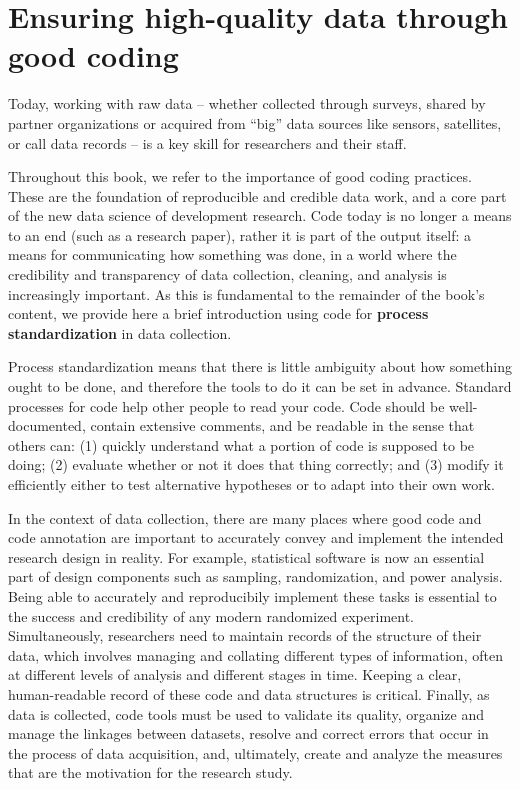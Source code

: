 \section{Ensuring high-quality data through good coding}


Today, working with raw data --
whether collected through surveys,
shared by partner organizations
or acquired from ``big'' data sources
like sensors, satellites, or call data records --
is a key skill for researchers and their staff.

Throughout this book, we refer to the importance of good coding practices.
These are the foundation of reproducible and credible data work,
and a core part of the new data science of development research.
Code today is no longer a means to an end (such as a research paper),
rather it is part of the output itself: a means for communicating how something was done,
in a world where the credibility and transparency of data collection, cleaning, and analysis is increasingly important.
As this is fundamental to the remainder of the book's content,
we provide here a brief introduction using code for \textbf{process standardization} in data collection.

Process standardization means that there is
little ambiguity about how something ought to be done,
and therefore the tools to do it can be set in advance.
Standard processes for code help other people to read your code.
Code should be well-documented, contain extensive comments, and be readable in the sense that others can:
(1) quickly understand what a portion of code is supposed to be doing;
(2) evaluate whether or not it does that thing correctly; and
(3) modify it efficiently either to test alternative hypotheses
or to adapt into their own work.

In the context of data collection, there are many places where good code and code annotation
are important to accurately convey and implement the intended research design in reality.
For example, statistical software is now an essential part of
design components such as sampling, randomization, and power analysis.
Being able to accurately and reproducibily implement these tasks
is essential to the success and credibility of any modern randomized experiment.
Simultaneously, researchers need to maintain records of the structure of their data,
which involves managing and collating different types of information,
often at different levels of analysis and different stages in time.
Keeping a clear, human-readable record of these code and data structures is critical.
Finally, as data is collected, code tools must be used to validate its quality,
organize and manage the linkages between datasets,
resolve and correct errors that occur in the process of data acquisition,
and, ultimately, create and analyze the measures that
are the motivation for the research study.

